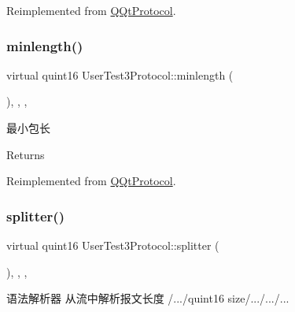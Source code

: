 Reimplemented from \mbox{\hyperlink{class_q_qt_protocol_af41bc3116abbbcfc9af45e151a253ff7}{Q\+Qt\+Protocol}}.

\mbox{\label{class_user_test3_protocol_adfd874c620f9488b27543cfa2957ee4f}} 
\subsubsection{\texorpdfstring{minlength()}{minlength()}}
{\footnotesize\ttfamily virtual quint16 User\+Test3\+Protocol\+::minlength (\begin{DoxyParamCaption}{ }\end{DoxyParamCaption})\hspace{0.3cm}{\ttfamily [inline]}, {\ttfamily [override]}, {\ttfamily [protected]}, {\ttfamily [virtual]}}



最小包长 

\begin{DoxyReturn}{Returns}

\end{DoxyReturn}


Reimplemented from \mbox{\hyperlink{class_q_qt_protocol_a2b00f53d3dd0eed817eeecff422891f3}{Q\+Qt\+Protocol}}.

\mbox{\label{class_user_test3_protocol_a5a7991a0479a865e1aa406d3ac4e6ca2}} 
\subsubsection{\texorpdfstring{splitter()}{splitter()}}
{\footnotesize\ttfamily virtual quint16 User\+Test3\+Protocol\+::splitter (\begin{DoxyParamCaption}\item[{const Q\+Byte\+Array \&}]{ }\end{DoxyParamCaption})\hspace{0.3cm}{\ttfamily [inline]}, {\ttfamily [override]}, {\ttfamily [protected]}, {\ttfamily [virtual]}}



语法解析器 从流中解析报文长度 /.../quint16 size/.../.../... 


